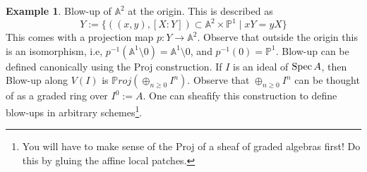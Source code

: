 \documentclass[11pt]{amsart}
\newcommand{\Proj}{{\P roj}}
\newcommand{\Spec}{{\rm Spec \,}}
\newcommand{\A}{{\mathbb A}}
\renewcommand{\P}{{\mathbb P}}
\theoremstyle{definition}
\newtheorem{example}[theorem]{Example}
\begin{document}
\begin{example}
	Blow-up of $\A^2$ at the origin. This is described as 
	\[Y:=\lbrace ((x,y),[X:Y])\subset \A^2\times\P^1\; |\; xY=yX\rbrace\]
	This comes with a projection map $p: Y\rightarrow \A^2$. Observe that outside the origin this is an isomorphism, i.e, $p^{-1}(\A^1\setminus 0)=\A^1\setminus 0$, and $p^{-1}(0)=\P^1$. Blow-up can be defined canonically using the Proj construction. If $I$ is an ideal of $\Spec A$, then Blow-up along $V(I)$ is $\Proj(\oplus_{n\geq 0}I^n)$. Observe that $\oplus_{n\geq 0}I^n$ can be thought of as a graded ring over $I^0:= A$. One can sheafify this construction to define blow-ups in arbitrary schemes\footnote{You will have to make sense of the Proj of a sheaf of graded algebras first! Do this by gluing the affine local patches.}.%
	
\end{example}
\end{document}

